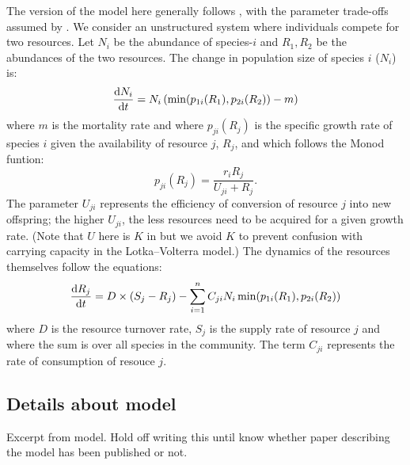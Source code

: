 \documentclass[a4paper,11pt]{article}
\begin{document}
The version of the \Rstar model here generally follows
\citet{Huisman-2001}, with the parameter trade-offs assumed by
\citet{Fox-2008}.
%
We consider an unstructured system where individuals compete for two
resources. Let $N_i$ be the abundance of species-$i$ and $R_1, R_2$ be
the abundances of the two resources.
%
The change in population size of species $i$ ($N_i$) is:
\begin{equation}
  \label{eq:rstar-n}
  \frac{\mathrm{d} N_i}{\mathrm{d} t} = N_i \, (\min(p_{1i}(R_1), p_{2i}(R_2)) - m)
\end{equation}
where $m$ is the mortality rate and where $p_{ji}(R_j)$ is the
specific growth rate of species $i$ given the availability of resource
$j$, $R_j$, and which follows the Monod funtion:
\begin{equation}
  \label{eq:rstar-p}
  p_{ji}(R_j) = \frac{r_i R_j}{U_{ji} + R_j}.
\end{equation}
%
The parameter $U_{ji}$ represents the efficiency of conversion of
resource $j$ into new offspring; the higher $U_{ji}$, the less
resources need to be acquired for a given growth rate.  (Note that $U$
here is $K$ in \citealt{Huisman-2001} but we avoid $K$ to prevent
confusion with carrying capacity in the Lotka--Volterra model.)
%
The dynamics of the resources themselves follow the equations:
\begin{equation}
  \label{eq:rstar-r}
  \frac{\mathrm{d} R_j}{\mathrm{d} t} =
  D \times (S_j - R_j) - \sum_{i=1}^n {C_{ji} N_i
    \min(p_{1i}(R_1), p_{2i}(R_2))}
\end{equation}
where $D$ is the resource turnover rate, $S_j$ is the supply rate of
resource $j$ and where the sum is over all species in the community.
The term $C_{ji}$ represents the rate of consumption of resouce $j$.


\subsection{Details about \plant model}\label{sec:plant}

Excerpt from  \plant model. Hold off writing this until know whether paper describing
the model has been published or not.
\end{document}
